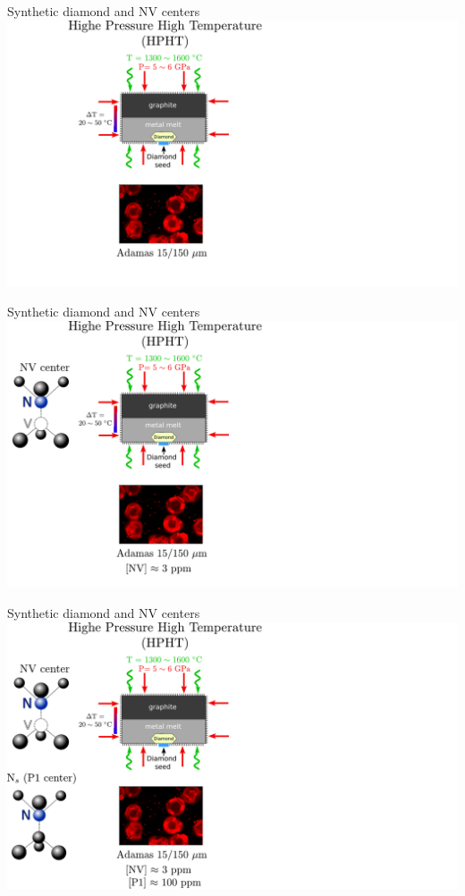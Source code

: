 \documentclass{beamer}
\begin{document}
\begin{frame}{Synthetic diamond and NV centers}
\centering
\includegraphics[width=\textwidth,height=0.85\textheight,keepaspectratio]{Slide_fab_sample-3}
\end{frame}

\begin{frame}{Synthetic diamond and NV centers}
\centering
\includegraphics[width=\textwidth,height=0.85\textheight,keepaspectratio]{Slide_fab_sample-2}
\end{frame}

\begin{frame}{Synthetic diamond and NV centers}
\centering
\includegraphics[width=\textwidth,height=0.85\textheight,keepaspectratio]{Slide_fab_sample-1}
\end{frame}
\end{document}
